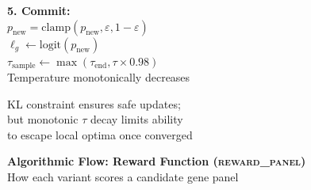\documentclass[8pt]{article}
\newlength{\colw}
\begin{document}
\begin{minipage}[t]{\colw}
\begin{keyboxB}
\textbf{5. Commit:}\\
$p_\text{new} = \text{clamp}(p_\text{new}, \varepsilon, 1{-}\varepsilon)$\\
$\ell_g \gets \text{logit}(p_\text{new})$\\
$\tau_\text{sample} \gets \max(\tau_\text{end}, \tau \times 0.98)$\\
{\scriptsize\color{addedB} Temperature monotonically decreases}
\end{keyboxB}

\vspace{3pt}
\begin{center}
{\scriptsize\color{black!50} KL constraint ensures safe updates;\\
but monotonic $\tau$ decay limits ability\\
to escape local optima once converged}
\end{center}
\end{minipage}

\newpage
\setlength{\colw}{0.315\textwidth}

\begin{center}
{\large\bfseries Algorithmic Flow: Reward Function (\textsc{reward\_panel})}\\[1pt]
{\scriptsize How each variant scores a candidate gene panel}
\end{center}
\vspace{2pt}
\end{document}
